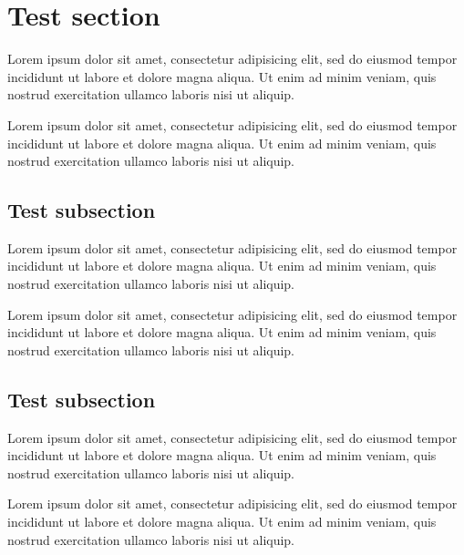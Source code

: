 \documentclass[12pt]{article}
\begin{document}
\section{Test section}

Lorem ipsum dolor sit amet, consectetur adipisicing elit, sed do eiusmod
tempor incididunt ut labore et dolore magna aliqua. Ut enim ad minim veniam,
quis nostrud exercitation ullamco laboris nisi ut aliquip.

Lorem ipsum dolor sit amet, consectetur adipisicing elit, sed do eiusmod
tempor incididunt ut labore et dolore magna aliqua. Ut enim ad minim veniam,
quis nostrud exercitation ullamco laboris nisi ut aliquip.

\subsection{Test subsection}

Lorem ipsum dolor sit amet, consectetur adipisicing elit, sed do eiusmod
tempor incididunt ut labore et dolore magna aliqua. Ut enim ad minim veniam,
quis nostrud exercitation ullamco laboris nisi ut aliquip.

Lorem ipsum dolor sit amet, consectetur adipisicing elit, sed do eiusmod
tempor incididunt ut labore et dolore magna aliqua. Ut enim ad minim veniam,
quis nostrud exercitation ullamco laboris nisi ut aliquip.

\subsection{Test subsection}

Lorem ipsum dolor sit amet, consectetur adipisicing elit, sed do eiusmod
tempor incididunt ut labore et dolore magna aliqua. Ut enim ad minim veniam,
quis nostrud exercitation ullamco laboris nisi ut aliquip.

Lorem ipsum dolor sit amet, consectetur adipisicing elit, sed do eiusmod
tempor incididunt ut labore et dolore magna aliqua. Ut enim ad minim veniam,
quis nostrud exercitation ullamco laboris nisi ut aliquip.
\end{document}
